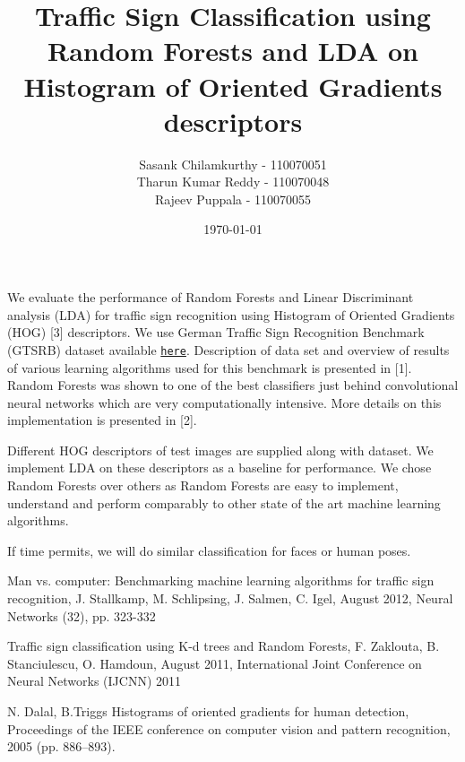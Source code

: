 \documentclass[a4paper]{article}
\begin{document}
\title{Traffic Sign Classification using Random Forests and LDA on Histogram of Oriented Gradients descriptors}
\author{Sasank Chilamkurthy - 110070051 \\
Tharun Kumar Reddy - 110070048\\
Rajeev Puppala - 110070055}
\date{\today}
\maketitle

We evaluate the performance of Random Forests and Linear Discriminant analysis (LDA) for traffic sign recognition using Histogram of Oriented Gradients (HOG) [3] descriptors. We use German Traffic Sign Recognition Benchmark (GTSRB) dataset available \texttt{\href{http://benchmark.ini.rub.de/?section=gtsrb&subsection=dataset}{here}}. Description of data set and overview of results of various learning algorithms used for this benchmark is presented in [1]. Random Forests was shown to one of the best classifiers just behind convolutional neural networks which are very computationally intensive. More details on this implementation is presented in [2].

Different HOG descriptors of test images are supplied along with dataset. We implement LDA on these descriptors as a baseline for performance. We chose Random Forests over others as Random Forests are easy to implement, understand and perform comparably to other state of the art machine learning algorithms.

If time permits, we will do similar classification for faces or human poses.

\begin{thebibliography}{4}

 Man vs. computer: Benchmarking machine learning algorithms for traffic sign recognition, J. Stallkamp, M. Schlipsing, J. Salmen, C. Igel, August 2012, Neural Networks (32), pp. 323-332

Traffic sign classification using K-d trees and Random Forests, F. Zaklouta, B. Stanciulescu, O. Hamdoun, August 2011, International Joint Conference on Neural Networks (IJCNN) 2011

N. Dalal, B.Triggs  Histograms of oriented gradients for human detection, Proceedings of the IEEE conference on computer vision and pattern recognition, 2005
(pp. 886–893).



\end{thebibliography}
\end{document}
